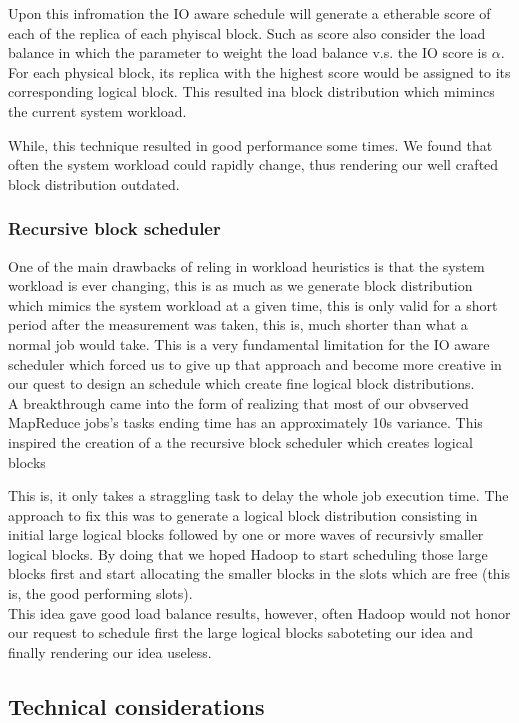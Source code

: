 Upon this infromation the IO aware schedule will generate a etherable score of each of the replica of each phyiscal block. Such as score also consider the load balance in which the parameter to weight the load balance v.s. the IO score is $\alpha$.
For each physical block, its replica with the highest score would be assigned to its corresponding logical block. This resulted ina block distribution which mimincs the current system workload. 

While, this technique resulted in good performance some times. We found that often the system workload could rapidly change, thus rendering our well crafted block distribution outdated.

\subsubsection{Recursive block scheduler}
One of the main drawbacks of reling in workload heuristics is that the system workload is ever changing, this is as much as we generate block distribution which mimics the system workload at a given time, this is only valid for a short period after the measurement was taken, this is, much shorter than what a normal job would take. This is a very fundamental limitation for the IO aware scheduler which forced us to give up that approach and become more creative in our quest to design an schedule which create fine logical block distributions. \\

A breakthrough came into the form of realizing that most of our obvserved MapReduce jobs's tasks ending time has an approximately 10s variance. This inspired the creation of a the recursive block scheduler which creates logical blocks 

This is, it only takes a straggling task to delay the whole job execution time. The approach to fix this was to generate a logical block distribution consisting in initial large logical blocks followed by one or more waves of recursivly smaller logical blocks. By doing that we hoped Hadoop to start scheduling those large blocks first and start allocating the smaller blocks in the slots which are free (this is, the good performing slots). \\
This idea gave good load balance results, however, often Hadoop would not honor our request to schedule first the large logical blocks saboteting our idea and finally rendering our idea useless.

\subsection{Technical considerations}
\lipsum[10]
